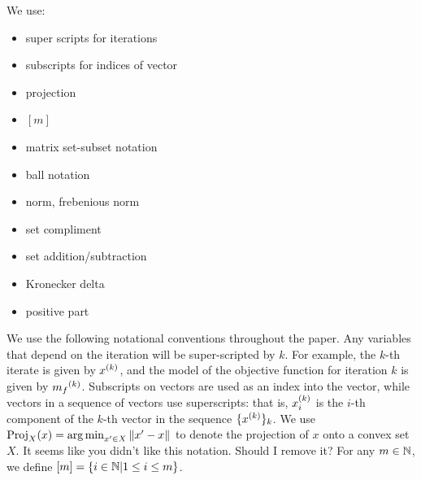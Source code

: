 \documentclass{article}
\begin{document}
We use:
\begin{itemize}
\item super scripts for iterations
\item subscripts for indices of vector
\item projection
\item $[m]$
\item matrix set-subset notation
\item ball notation
\item norm, frebenious norm
\item set compliment
\item set addition/subtraction
\item Kronecker delta
\item positive part
\end{itemize}



We use the following notational conventions throughout the paper.
Any variables that depend on the iteration will be super-scripted by $k$.
For example, the $k$-th iterate is given by $x^{(k)}$,
and the model of the objective function for iteration $k$ is given by ${{m}_f}^{(k)}$.
Subscripts on vectors are used as an index into the vector, while vectors in a sequence of vectors use superscripts:
that is, $x_i^{(k)}$ is the $i$-th component of the $k$-th vector in the sequence $\{x^{(k)}\}_k$.
We use ${\textrm{Proj}}_X(x) = \operatorname*{arg\,min}_{x' \in X}\left\|x' - x\right\|$ to denote the projection of $x$ onto a convex set $X$.
\color{magenta}
It seems like you didn't like this notation. Should I remove it?
\color{black}
For any $m \in \mathbb N$, we define $[m] = \left\{i \in \mathbb N | 1 \le i \le m\right\}$.
\end{document}
